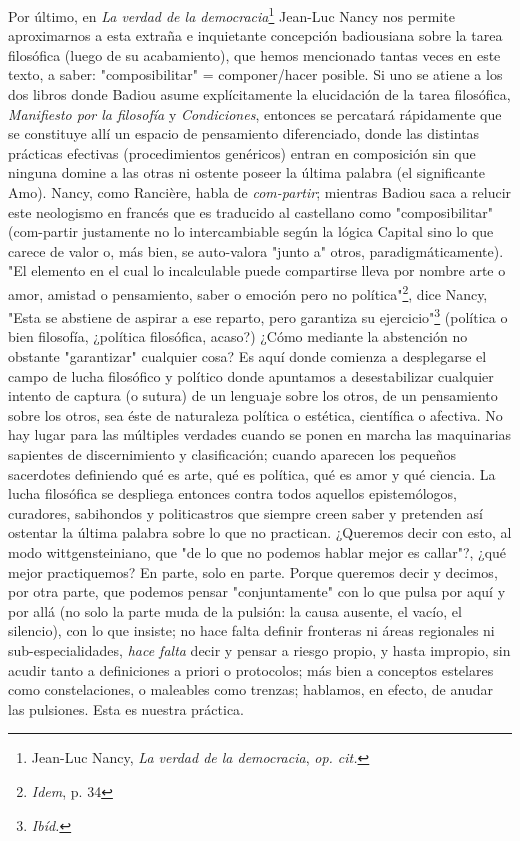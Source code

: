 Por último, en \emph{La verdad de la democracia}\footnote{Jean-Luc
  Nancy, \emph{La verdad de la democracia}, \emph{op. cit.}} Jean-Luc
Nancy nos permite aproximarnos a esta extraña e inquietante concepción
badiousiana sobre la tarea filosófica (luego de su acabamiento), que
hemos mencionado tantas veces en este texto, a saber: "composibilitar" =
componer/hacer posible. Si uno se atiene a los dos libros donde Badiou
asume explícitamente la elucidación de la tarea filosófica,
\emph{Manifiesto por la filosofía} y \emph{Condiciones}, entonces se
percatará rápidamente que se constituye allí un espacio de pensamiento
diferenciado, donde las distintas prácticas efectivas (procedimientos
genéricos) entran en composición sin que ninguna domine a las otras ni
ostente poseer la última palabra (el significante Amo). Nancy, como
Rancière, habla de \emph{com-partir}; mientras Badiou saca a relucir
este neologismo en francés que es traducido al castellano como
"composibilitar" (com-partir justamente no lo intercambiable según la
lógica Capital sino lo que carece de valor o, más bien, se auto-valora
"junto a" otros, paradigmáticamente). "El elemento en el cual lo
incalculable puede compartirse lleva por nombre arte o amor, amistad o
pensamiento, saber o emoción pero no política"\footnote{\emph{Idem}, p.
  34}, dice Nancy, "Esta se abstiene de aspirar a ese reparto, pero
garantiza su ejercicio"\footnote{\emph{Ibíd.}} (política o bien
filosofía, ¿política filosófica, acaso?) ¿Cómo mediante la abstención no
obstante "garantizar" cualquier cosa? Es aquí donde comienza a
desplegarse el campo de lucha filosófico y político donde apuntamos a
desestabilizar cualquier intento de captura (o sutura) de un lenguaje
sobre los otros, de un pensamiento sobre los otros, sea éste de
naturaleza política o estética, científica o afectiva. No hay lugar para
las múltiples verdades cuando se ponen en marcha las maquinarias
sapientes de discernimiento y clasificación; cuando aparecen los
pequeños sacerdotes definiendo qué es arte, qué es política, qué es amor
y qué ciencia. La lucha filosófica se despliega entonces contra todos
aquellos epistemólogos, curadores, sabihondos y politicastros que
siempre creen saber y pretenden así ostentar la última palabra sobre lo
que no practican. ¿Queremos decir con esto, al modo wittgensteiniano,
que "de lo que no podemos hablar mejor es callar"?, ¿qué mejor
practiquemos? En parte, solo en parte. Porque queremos decir y decimos,
por otra parte, que podemos pensar "conjuntamente" con lo que pulsa por
aquí y por allá (no solo la parte muda de la pulsión: la causa ausente,
el vacío, el silencio), con lo que insiste; no hace falta definir
fronteras ni áreas regionales ni sub-especialidades, \emph{hace falta}
decir y pensar a riesgo propio, y hasta impropio, sin acudir tanto a
definiciones a priori o protocolos; más bien a conceptos estelares como
constelaciones, o maleables como trenzas; hablamos, en efecto, de anudar
las pulsiones. Esta es nuestra práctica.


